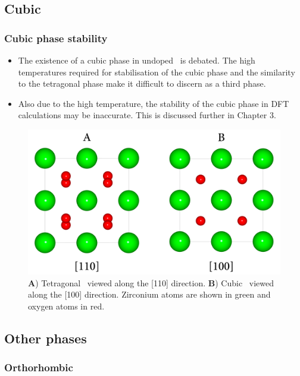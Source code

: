 \subsection{Cubic}

\subsubsection{Cubic phase stability}

\begin{itemize}
\item The existence of a cubic phase in undoped \zirconia\ is debated. The high temperatures required for stabilisation of the cubic phase and the similarity to the tetragonal phase make it difficult to discern as a third phase.
\item Also due to the high temperature, the stability of the cubic phase in DFT calculations may be inaccurate. This is discussed further in Chapter 3.
\end{itemize}

\begin{figure}[htp]
\centering
\includegraphics[width=\linewidth]{images/tet_vs_cubic.png}
\caption{\textbf{A}) Tetragonal \zirconia\ viewed along the [110] direction. \textbf{B}) Cubic \zirconia\ viewed along the [100] direction. Zirconium atoms are shown in green and oxygen atoms in red.}
\label{figure:tetvscubic}
\end{figure}

\subsection{Other phases}

\subsubsection{Orthorhombic}

